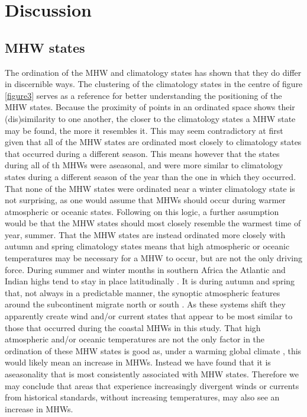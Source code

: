 \documentclass[utf8]{frontiersSCNS}
\begin{document}
\section{Discussion}
\subsection{MHW states}
The ordination of the MHW and climatology states has shown that they do differ in discernible ways. The clustering of the climatology states in the centre of figure \ref{figure3} serves as a reference for better understanding the positioning of the MHW states. Because the proximity of points in an ordinated space shows their (dis)similarity to one another, the closer to the climatology states a MHW state may be found, the more it resembles it. This may seem contradictory at first given that all of the MHW states are ordinated most closely to climatology states that occurred during a different season. This means however that the states during all of th MHWs were aseasonal, and were more similar to climatology states during a different season of the year than the one in which they occurred. That none of the MHW states were ordinated near a winter climatology state is not surprising, as one would assume that MHWs should occur during warmer atmospheric or oceanic states. Following on this logic, a further assumption would be that the MHW states should most closely resemble the warmest time of year, summer. That the MHW states are instead ordinated more closely with autumn and spring climatology states means that high atmospheric or oceanic temperatures may be necessary for a MHW to occur, but are not the only driving force. During summer and winter months in southern Africa the Atlantic and Indian highs tend to stay in place latitudinally \citep{vanHeerden1998}. It is during autumn and spring that, not always in a predictable manner, the synoptic atmospheric features around the subcontinent migrate north or south \citep{vanHeerden1998}. As these systems shift they apparently create wind and/or current states that appear to be most similar to those that occurred during the coastal MHWs in this study. That high atmospheric and/or oceanic temperatures are not the only factor in the ordination of these MHW states is good as, under a warming global climate \citep{Pachauri2014}, this would likely mean an increase in MHWs. Instead we have found that it is aseasonality that is most consistently associated with MHW states. Therefore we may conclude that areas that experience increasingly divergent winds or currents from historical standards, without increasing temperatures, may also see an increase in MHWs.
\end{document}

